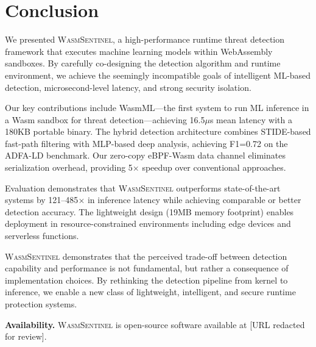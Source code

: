 
\section{Conclusion}
\label{sec:conclusion}

We presented \textsc{WasmSentinel}, a high-performance runtime threat detection framework that executes machine learning models within WebAssembly sandboxes.
By carefully co-designing the detection algorithm and runtime environment, we achieve the seemingly incompatible goals of intelligent ML-based detection, microsecond-level latency, and strong security isolation.

Our key contributions include WasmML---the first system to run ML inference in a Wasm sandbox for threat detection---achieving 16.5$\mu$s mean latency with a 180KB portable binary.
The hybrid detection architecture combines STIDE-based fast-path filtering with MLP-based deep analysis, achieving F1=0.72 on the ADFA-LD benchmark.
Our zero-copy eBPF-Wasm data channel eliminates serialization overhead, providing 5$\times$ speedup over conventional approaches.

Evaluation demonstrates that \textsc{WasmSentinel} outperforms state-of-the-art systems by 121--485$\times$ in inference latency while achieving comparable or better detection accuracy.
The lightweight design (19MB memory footprint) enables deployment in resource-constrained environments including edge devices and serverless functions.

\textsc{WasmSentinel} demonstrates that the perceived trade-off between detection capability and performance is not fundamental, but rather a consequence of implementation choices.
By rethinking the detection pipeline from kernel to inference, we enable a new class of lightweight, intelligent, and secure runtime protection systems.

\textbf{Availability.}
\textsc{WasmSentinel} is open-source software available at [URL redacted for review].
